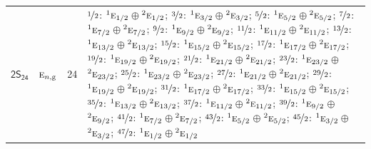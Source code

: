 \documentclass[10pt,a4paper]{article}
\numberwithin{equation}{section}
\newcommand{\grp}[1]{\mathsf{#1}}
\newcommand{\irr}[1]{\text{\normalfont\scshape #1}}
\newcommand{\conjpair}[1]{{}^{#1}}
\newcommand{\ptag}[1]{\mathrm{#1}}
\newlength{\fillwidth}\newlength{\cellwidth}\newlength{\colwidth}
\begin{document}
{\begin{longtable}{@{}llr>{\RaggedRight\arraybackslash}p{\fillwidth}@{}}
\href{2S24.pdf}{$\grp{2S_{24}}$} & $\irr{e}_{n,\ptag{g}}$ & 24 & $\nicefrac{1}{2}$: $\conjpair{1}\irr{e}_{1/2}$${}\oplus{}$$\conjpair{2}\irr{e}_{1/2}$; $\nicefrac{3}{2}$: $\conjpair{1}\irr{e}_{3/2}$${}\oplus{}$$\conjpair{2}\irr{e}_{3/2}$; $\nicefrac{5}{2}$: $\conjpair{1}\irr{e}_{5/2}$${}\oplus{}$$\conjpair{2}\irr{e}_{5/2}$; $\nicefrac{7}{2}$: $\conjpair{1}\irr{e}_{7/2}$${}\oplus{}$$\conjpair{2}\irr{e}_{7/2}$; $\nicefrac{9}{2}$: $\conjpair{1}\irr{e}_{9/2}$${}\oplus{}$$\conjpair{2}\irr{e}_{9/2}$; $\nicefrac{11}{2}$: $\conjpair{1}\irr{e}_{11/2}$${}\oplus{}$$\conjpair{2}\irr{e}_{11/2}$; $\nicefrac{13}{2}$: $\conjpair{1}\irr{e}_{13/2}$${}\oplus{}$$\conjpair{2}\irr{e}_{13/2}$; $\nicefrac{15}{2}$: $\conjpair{1}\irr{e}_{15/2}$${}\oplus{}$$\conjpair{2}\irr{e}_{15/2}$; $\nicefrac{17}{2}$: $\conjpair{1}\irr{e}_{17/2}$${}\oplus{}$$\conjpair{2}\irr{e}_{17/2}$; $\nicefrac{19}{2}$: $\conjpair{1}\irr{e}_{19/2}$${}\oplus{}$$\conjpair{2}\irr{e}_{19/2}$; $\nicefrac{21}{2}$: $\conjpair{1}\irr{e}_{21/2}$${}\oplus{}$$\conjpair{2}\irr{e}_{21/2}$; $\nicefrac{23}{2}$: $\conjpair{1}\irr{e}_{23/2}$${}\oplus{}$$\conjpair{2}\irr{e}_{23/2}$; $\nicefrac{25}{2}$: $\conjpair{1}\irr{e}_{23/2}$${}\oplus{}$$\conjpair{2}\irr{e}_{23/2}$; $\nicefrac{27}{2}$: $\conjpair{1}\irr{e}_{21/2}$${}\oplus{}$$\conjpair{2}\irr{e}_{21/2}$; $\nicefrac{29}{2}$: $\conjpair{1}\irr{e}_{19/2}$${}\oplus{}$$\conjpair{2}\irr{e}_{19/2}$; $\nicefrac{31}{2}$: $\conjpair{1}\irr{e}_{17/2}$${}\oplus{}$$\conjpair{2}\irr{e}_{17/2}$; $\nicefrac{33}{2}$: $\conjpair{1}\irr{e}_{15/2}$${}\oplus{}$$\conjpair{2}\irr{e}_{15/2}$; $\nicefrac{35}{2}$: $\conjpair{1}\irr{e}_{13/2}$${}\oplus{}$$\conjpair{2}\irr{e}_{13/2}$; $\nicefrac{37}{2}$: $\conjpair{1}\irr{e}_{11/2}$${}\oplus{}$$\conjpair{2}\irr{e}_{11/2}$; $\nicefrac{39}{2}$: $\conjpair{1}\irr{e}_{9/2}$${}\oplus{}$$\conjpair{2}\irr{e}_{9/2}$; $\nicefrac{41}{2}$: $\conjpair{1}\irr{e}_{7/2}$${}\oplus{}$$\conjpair{2}\irr{e}_{7/2}$; $\nicefrac{43}{2}$: $\conjpair{1}\irr{e}_{5/2}$${}\oplus{}$$\conjpair{2}\irr{e}_{5/2}$; $\nicefrac{45}{2}$: $\conjpair{1}\irr{e}_{3/2}$${}\oplus{}$$\conjpair{2}\irr{e}_{3/2}$; $\nicefrac{47}{2}$: $\conjpair{1}\irr{e}_{1/2}$${}\oplus{}$$\conjpair{2}\irr{e}_{1/2}$\\

\end{longtable}}
\end{document}
